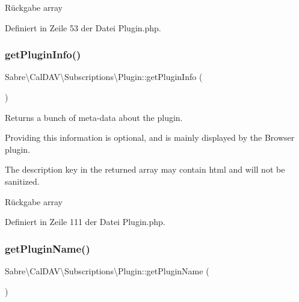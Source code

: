 \begin{DoxyReturn}{Rückgabe}
array 
\end{DoxyReturn}


Definiert in Zeile 53 der Datei Plugin.\+php.

\mbox{\label{class_sabre_1_1_cal_d_a_v_1_1_subscriptions_1_1_plugin_a47f2d39181c7798dfc956b33f9376266}} 
\subsubsection{\texorpdfstring{get\+Plugin\+Info()}{getPluginInfo()}}
{\footnotesize\ttfamily Sabre\textbackslash{}\+Cal\+D\+A\+V\textbackslash{}\+Subscriptions\textbackslash{}\+Plugin\+::get\+Plugin\+Info (\begin{DoxyParamCaption}{ }\end{DoxyParamCaption})}

Returns a bunch of meta-\/data about the plugin.

Providing this information is optional, and is mainly displayed by the Browser plugin.

The description key in the returned array may contain html and will not be sanitized.

\begin{DoxyReturn}{Rückgabe}
array 
\end{DoxyReturn}


Definiert in Zeile 111 der Datei Plugin.\+php.

\mbox{\label{class_sabre_1_1_cal_d_a_v_1_1_subscriptions_1_1_plugin_a17d0df9b87139bfe08e8b6b8dd3d978c}} 
\subsubsection{\texorpdfstring{get\+Plugin\+Name()}{getPluginName()}}
{\footnotesize\ttfamily Sabre\textbackslash{}\+Cal\+D\+A\+V\textbackslash{}\+Subscriptions\textbackslash{}\+Plugin\+::get\+Plugin\+Name (\begin{DoxyParamCaption}{ }\end{DoxyParamCaption})}

